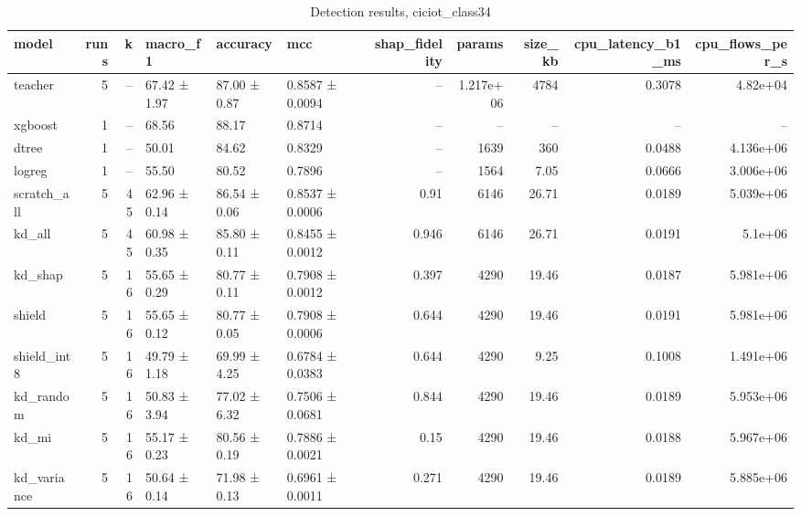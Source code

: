 \begin{table}
\caption{Detection results, ciciot_class34}
\begin{tabular}{lrrlllrrrrr}
\toprule
model & runs & k & macro_f1 & accuracy & mcc & shap_fidelity & params & size_kb & cpu_latency_b1_ms & cpu_flows_per_s \\
\midrule
teacher & 5 & -- & 67.42 ± 1.97 & 87.00 ± 0.87 & 0.8587 ± 0.0094 & -- & 1.217e+06 & 4784 & 0.3078 & 4.82e+04 \\
xgboost & 1 & -- & 68.56 & 88.17 & 0.8714 & -- & -- & -- & -- & -- \\
dtree & 1 & -- & 50.01 & 84.62 & 0.8329 & -- & 1639 & 360 & 0.0488 & 4.136e+06 \\
logreg & 1 & -- & 55.50 & 80.52 & 0.7896 & -- & 1564 & 7.05 & 0.0666 & 3.006e+06 \\
scratch_all & 5 & 45 & 62.96 ± 0.14 & 86.54 ± 0.06 & 0.8537 ± 0.0006 & 0.91 & 6146 & 26.71 & 0.0189 & 5.039e+06 \\
kd_all & 5 & 45 & 60.98 ± 0.35 & 85.80 ± 0.11 & 0.8455 ± 0.0012 & 0.946 & 6146 & 26.71 & 0.0191 & 5.1e+06 \\
kd_shap & 5 & 16 & 55.65 ± 0.29 & 80.77 ± 0.11 & 0.7908 ± 0.0012 & 0.397 & 4290 & 19.46 & 0.0187 & 5.981e+06 \\
shield & 5 & 16 & 55.65 ± 0.12 & 80.77 ± 0.05 & 0.7908 ± 0.0006 & 0.644 & 4290 & 19.46 & 0.0191 & 5.981e+06 \\
shield_int8 & 5 & 16 & 49.79 ± 1.18 & 69.99 ± 4.25 & 0.6784 ± 0.0383 & 0.644 & 4290 & 9.25 & 0.1008 & 1.491e+06 \\
kd_random & 5 & 16 & 50.83 ± 3.94 & 77.02 ± 6.32 & 0.7506 ± 0.0681 & 0.844 & 4290 & 19.46 & 0.0189 & 5.953e+06 \\
kd_mi & 5 & 16 & 55.17 ± 0.23 & 80.56 ± 0.19 & 0.7886 ± 0.0021 & 0.15 & 4290 & 19.46 & 0.0188 & 5.967e+06 \\
kd_variance & 5 & 16 & 50.64 ± 0.14 & 71.98 ± 0.13 & 0.6961 ± 0.0011 & 0.271 & 4290 & 19.46 & 0.0189 & 5.885e+06 \\
\bottomrule
\end{tabular}
\end{table}

